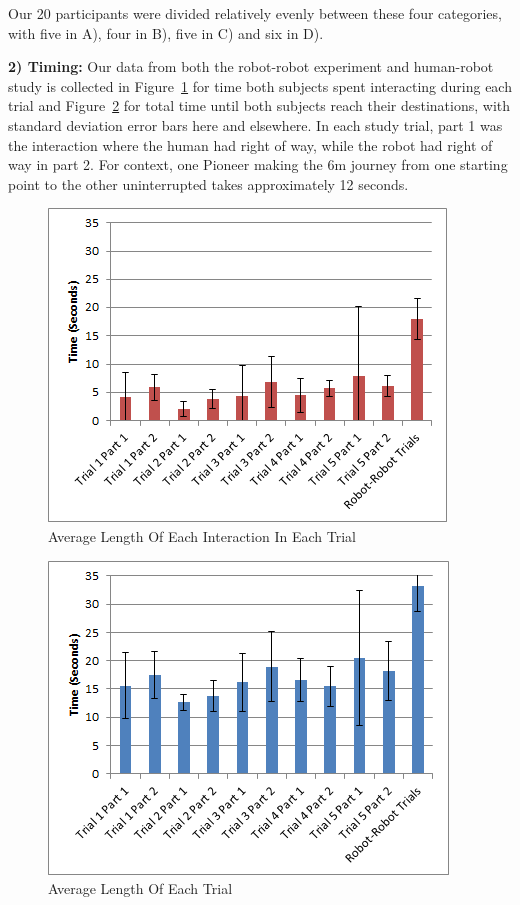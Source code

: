 \documentclass[letterpaper, 10 pt, conference]{ieeeconf}  %
\begin{document}
Our 20 participants were divided relatively evenly between these four categories, with five in A), four in B), five in C) and six in D).
 
\textbf{2) Timing:} Our data from both the robot-robot experiment and human-robot study is collected in Figure~\ref{fig:Interaction} for time both subjects spent interacting during each trial and Figure~\ref{fig:Trial} for total time until both subjects reach their destinations, with standard deviation error bars here and elsewhere. In each study trial, part 1 was the interaction where the human had right of way, while the robot had right of way in part 2. For context, one Pioneer making the 6m journey from one starting point to the other uninterrupted takes approximately 12 seconds.   
 

       \begin{figure}
      \centering
      \includegraphics{interaction_length.png}
      \caption{Average Length Of Each Interaction In Each Trial}
      \label{fig:Interaction}
   \end{figure}


     \begin{figure}
      \centering
      \includegraphics{trial_length.png}
      \caption{Average Length Of Each Trial}
      \label{fig:Trial}
   \end{figure}
\end{document}
